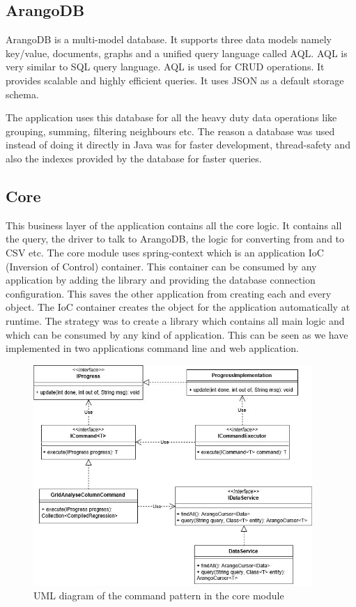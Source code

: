 \subsection{ArangoDB}

ArangoDB is a multi-model database. It supports three data models namely key/value, documents, graphs and a unified query language called AQL. AQL is very similar to SQL query language. AQL is used for CRUD operations. It provides scalable and highly efficient queries. It uses JSON as a default storage schema. 

The application uses this database for all the heavy duty data operations like grouping, summing, filtering neighbours etc. The reason a database was used instead of doing it directly in Java was for faster development, thread-safety and also the indexes provided by the database for faster queries. 

\subsection{Core}

This business layer of the application contains all the core logic. It contains all the query, the driver to talk to ArangoDB, the logic for converting from and to CSV etc. The core module uses spring-context which is an application IoC (Inversion of Control) container. This container can be consumed by any application by adding the library and providing the database connection configuration. This saves the other application from creating each and every object. The IoC container creates the object for the application automatically at runtime. The strategy was to create a library which contains all main logic and which can be consumed by any kind of application. This can be seen as we have implemented in two applications command line and web application.

\begin{figure}[!ht]
    \centering
    \includegraphics[width=300pt]{umlcore}
    \caption{\label{fig:umlcore} UML diagram of the command pattern in the core module}
\end{figure}

